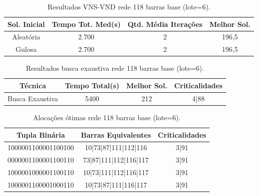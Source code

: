 \documentclass[12pt]{article}
\begin{document}
\begin{table}[H]
	\centering
	\caption{Resultados VNS-VND rede 118 barras base (lote=6).}
	\begin{tabular}{|c|c|c|c|}
		\hline
		\textbf{Sol. Inicial} & \textbf{Tempo Tot. Med(s)} & \textbf{Qtd. Média Iterações} & \textbf{Melhor Sol.} \\
		\hline
		Aleatória & 2.700 & 2     & 196,5 \\
		\hline
		Gulosa & 2.700 & 2     & 196,5 \\
		\hline
	\end{tabular}%
	\label{tab15}%
\end{table}%

\begin{table}[H]
	\centering
	\caption{Resultados busca exaustiva rede 118 barras base (lote=6).}
	\begin{tabular}{|c|c|c|c|}
		\hline
		\textbf{Técnica} & \textbf{Tempo Total(s)} & \textbf{Melhor Sol.} & \textbf{Criticalidades} \\
		\hline
		Busca Exaustiva & 5400  & 212   & 4|88 \\
		\hline
	\end{tabular}%
	\label{tab16}%
\end{table}%

\begin{table}[H]
	\centering
	\caption{Alocações ótimas rede 118 barras base (lote=6).}
	\begin{tabular}{|l|c|c|}
		\hline
		\multicolumn{1}{|c|}{\textbf{Tupla Binária}} & \textbf{Barras Equivalentes} & \multicolumn{1}{l|}{\textbf{Criticalidades}} \\
		\hline
		1000001100001100100 & 10|73|87|111|112|116 & 3|91 \\
		\hline
		0000001100001100110 & 73|87|111|112|116|117 & 3|91 \\
		\hline
		1000001000001100110 & 10|73|111|112|116|117 & 3|91 \\
		\hline
		1000001100001000110 & 10|73|87|111|116|117 & 3|91 \\
		\hline
	\end{tabular}%
	\label{tab17}%
\end{table}%
\end{document}
